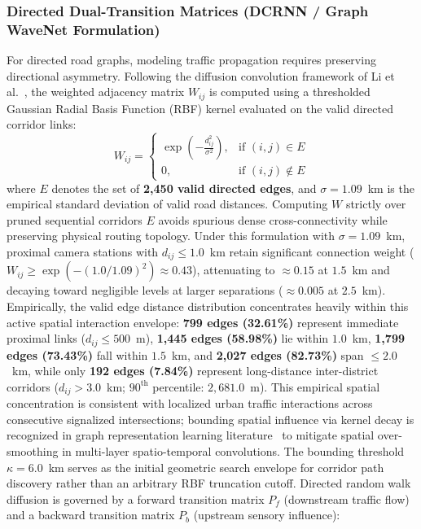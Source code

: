 \documentclass[preprint,12pt]{elsarticle}
\begin{document}
\subsubsection{Directed Dual-Transition Matrices (DCRNN / Graph WaveNet Formulation)}
For directed road graphs, modeling traffic propagation requires preserving directional asymmetry. Following the diffusion convolution framework of Li et al.~\cite{li2018diffusion}, the weighted adjacency matrix $W_{ij}$ is computed using a thresholded Gaussian Radial Basis Function (RBF) kernel evaluated on the valid directed corridor links:
\begin{equation}
    W_{ij} = \begin{cases} 
    \exp\left( -\frac{d_{ij}^2}{\sigma^2} \right), & \text{if } (i, j) \in E \\ 
    0, & \text{if } (i, j) \notin E 
    \end{cases}
\end{equation}
where $E$ denotes the set of \textbf{2,450 valid directed edges}, and $\sigma = \mathbf{1.09}$~km is the empirical standard deviation of valid road distances. Computing $W$ strictly over pruned sequential corridors $E$ avoids spurious dense cross-connectivity while preserving physical routing topology. Under this formulation with $\sigma = 1.09$~km, proximal camera stations with $d_{ij} \le 1.0$~km retain significant connection weight ($W_{ij} \ge \exp(-(1.0/1.09)^2) \approx 0.43$), attenuating to $\approx 0.15$ at $1.5$~km and decaying toward negligible levels at larger separations ($\approx 0.005$ at $2.5$~km). Empirically, the valid edge distance distribution concentrates heavily within this active spatial interaction envelope: \textbf{799 edges (32.61\%)} represent immediate proximal links ($d_{ij} \le 500$~m), \textbf{1,445 edges (58.98\%)} lie within $1.0$~km, \textbf{1,799 edges (73.43\%)} fall within $1.5$~km, and \textbf{2,027 edges (82.73\%)} span $\le 2.0$~km, while only \textbf{192 edges (7.84\%)} represent long-distance inter-district corridors ($d_{ij} > 3.0$~km; $90^{\text{th}}$ percentile: $2,681.0$~m). This empirical spatial concentration is consistent with localized urban traffic interactions across consecutive signalized intersections; bounding spatial influence via kernel decay is recognized in graph representation learning literature~\cite{li2018diffusion,wu2019graph} to mitigate spatial over-smoothing in multi-layer spatio-temporal convolutions. The bounding threshold $\kappa = 6.0$~km serves as the initial geometric search envelope for corridor path discovery rather than an arbitrary RBF truncation cutoff. Directed random walk diffusion is governed by a forward transition matrix $P_f$ (downstream traffic flow) and a backward transition matrix $P_b$ (upstream sensory influence):
\end{document}
